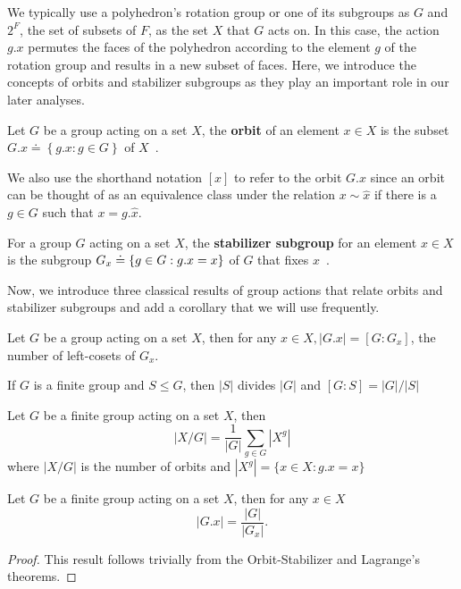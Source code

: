 We typically use a polyhedron's rotation group or one of its subgroups as $G$ and $2^F$, the set of subsets of $F$, as the set $X$ that $G$ acts on. In this case, the action $g.x$ permutes the faces of the polyhedron according to the element $g$ of the rotation group and results in a new subset of faces. Here, we introduce the concepts of orbits and stabilizer subgroups as they play an important role in our later analyses. 
\begin{mydef}%
Let $G$ be a group acting on a set $X$, the \textbf{orbit} of an element $x \in X$ is the subset $G.x \doteq \left\{g.x : g \in G \right\}$ of $X$~\cite{Rotman1995}.
\end{mydef}
We also use the shorthand notation $[x]$ to refer to the orbit $G.x$ since an orbit can be thought of as an equivalence class under the relation $x \sim \hat{x}$ if there is a $g \in G$ such that $x = g.\hat{x}$. 
\begin{mydef}%
For a  group $G$ acting on a set $X$, the \textbf{stabilizer subgroup} for an element $x\in X$ is the subgroup $G_x \doteq \left\{g \in {G} :g. x = x \right\}$ of $G$ that fixes $x$~\cite{Rotman1995}.
\end{mydef}
Now, we introduce three classical results of group actions that relate orbits and stabilizer subgroups and add a corollary that we will use frequently.
\begin{mythm}
Let $G$ be a group acting on a set $X$, then for any $x \in X, |G.x| = [G:G_x]$, the number of left-cosets of $G_x$.
\end{mythm}
\begin{mythm}
If $G$ is a finite group and $S \leq G$, then $|S|$ divides $|G|$ and $[G:S] = |G|/|S|$
\end{mythm}
\begin{mylem}
Let $G$ be a finite group acting on a set $X$, then $$|X/G| = \frac{1}{|G|}\sum_{g \in G}|X^g|$$ where $|X/G|$ is the number of orbits and $|X^g| = \{x \in X : g.x = x\}$ 
\end{mylem}

\begin{mycor}
\label{cor:OST}
Let $G$ be a finite group acting on a set $X$, then for any $x \in X$ $$|G.x| = \frac{|G|}{|G_x|}.$$
\end{mycor}
\begin{proof}
This result follows trivially from the Orbit-Stabilizer and Lagrange's theorems. 
\end{proof}


